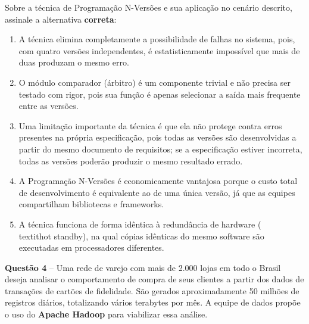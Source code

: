 \documentclass[12pt,a4paper]{article}
\begin{document}
\vspace{0.2cm}

Sobre a técnica de Programação N-Versões e sua aplicação no cenário descrito, assinale a alternativa \textbf{correta}:

\vspace{0.3cm}

\begin{enumerate}[label=\textbf{(\Alph*)}]
    \item A técnica elimina completamente a possibilidade de falhas no sistema, pois, com quatro versões independentes, é estatisticamente impossível que mais de duas produzam o mesmo erro.

    \item O módulo comparador (árbitro) é um componente trivial e não precisa ser testado com rigor, pois sua função é apenas selecionar a saída mais frequente entre as versões.

    \item Uma limitação importante da técnica é que ela não protege contra erros presentes na própria especificação, pois todas as versões são desenvolvidas a partir do mesmo documento de requisitos; se a especificação estiver incorreta, todas as versões poderão produzir o mesmo resultado errado.

    \item A Programação N-Versões é economicamente vantajosa porque o custo total de desenvolvimento é equivalente ao de uma única versão, já que as equipes compartilham bibliotecas e frameworks.

    \item A técnica funciona de forma idêntica à redundância de hardware (\\textit{hot standby}), na qual cópias idênticas do mesmo software são executadas em processadores diferentes.
\end{enumerate}

\vspace{0.5cm}

\textbf{Questão 4} -- Uma rede de varejo com mais de 2.000 lojas em todo o Brasil deseja analisar o comportamento de compra de seus clientes a partir dos dados de transações de cartões de fidelidade. São gerados aproximadamente 50 milhões de registros diários, totalizando vários terabytes por mês. A equipe de dados propõe o uso do \textbf{Apache Hadoop} para viabilizar essa análise.
\end{document}
